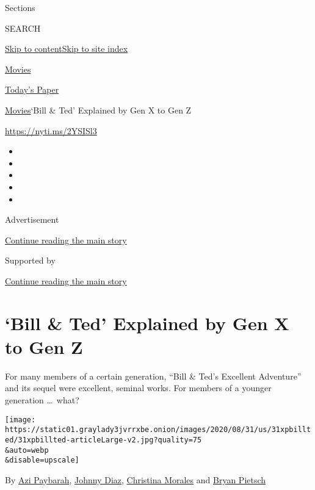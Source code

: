 Sections

SEARCH

\protect\hyperlink{site-content}{Skip to
content}\protect\hyperlink{site-index}{Skip to site index}

\href{https://www.nytimes3xbfgragh.onion/section/movies}{Movies}

\href{https://myaccount.nytimes3xbfgragh.onion/auth/login?response_type=cookie\&client_id=vi}{}

\href{https://www.nytimes3xbfgragh.onion/section/todayspaper}{Today's
Paper}

\href{/section/movies}{Movies}\textbar{}`Bill \& Ted' Explained by Gen X
to Gen Z

\url{https://nyti.ms/2YSISl3}

\begin{itemize}
\item
\item
\item
\item
\item
\end{itemize}

Advertisement

\protect\hyperlink{after-top}{Continue reading the main story}

Supported by

\protect\hyperlink{after-sponsor}{Continue reading the main story}

\hypertarget{bill--ted-explained-by-gen-x-to-gen-z}{%
\section{`Bill \& Ted' Explained by Gen X to Gen
Z}\label{bill--ted-explained-by-gen-x-to-gen-z}}

For many members of a certain generation, ``Bill \& Ted's Excellent
Adventure'' and its sequel were excellent, seminal works. For members of
a younger generation \ldots{}~what?

\texttt{[image: https://static01.graylady3jvrrxbe.onion/images/2020/08/31/us/31xpbillted/31xpbillted-articleLarge-v2.jpg?quality=75\\\&auto=webp\\\&disable=upscale]}

By \href{https://www.nytimes3xbfgragh.onion/by/azi-paybarah}{Azi
Paybarah},
\href{https://www.nytimes3xbfgragh.onion/by/johnny-diaz}{Johnny Diaz},
\href{https://www.nytimes3xbfgragh.onion/by/christina-morales}{Christina
Morales} and
\href{https://www.nytimes3xbfgragh.onion/by/bryan-pietsch}{Bryan
Pietsch}

